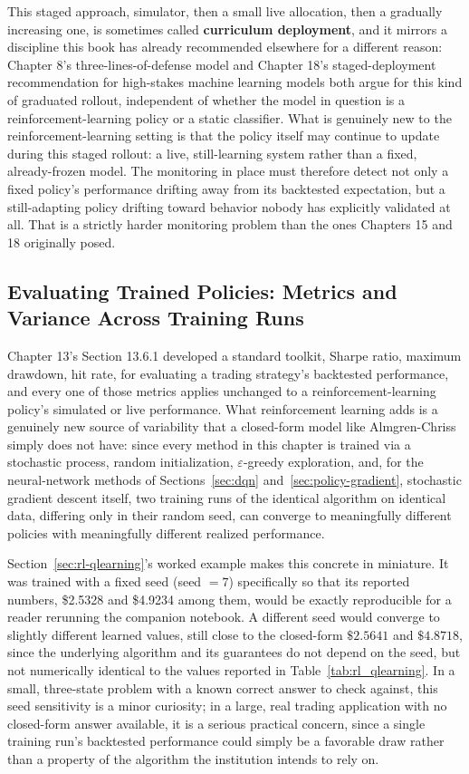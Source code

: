 \documentclass[../ai_in_finance]{subfiles}
\begin{document}
This staged approach, simulator, then a small live allocation, then a gradually increasing one, is sometimes called \textbf{curriculum deployment}, and it mirrors a discipline this book has already recommended elsewhere for a different reason: Chapter 8's three-lines-of-defense model and Chapter 18's staged-deployment recommendation for high-stakes machine learning models both argue for this kind of graduated rollout, independent of whether the model in question is a reinforcement-learning policy or a static classifier. What is genuinely new to the reinforcement-learning setting is that the policy itself may continue to update during this staged rollout: a live, still-learning system rather than a fixed, already-frozen model. The monitoring in place must therefore detect not only a fixed policy's performance drifting away from its backtested expectation, but a still-adapting policy drifting toward behavior nobody has explicitly validated at all. That is a strictly harder monitoring problem than the ones Chapters 15 and 18 originally posed.

\subsection{Evaluating Trained Policies: Metrics and Variance Across Training Runs}
\label{sec:rl-eval-metrics}

Chapter 13's Section 13.6.1 developed a standard toolkit, Sharpe ratio, maximum drawdown, hit rate, for evaluating a trading strategy's backtested performance, and every one of those metrics applies unchanged to a reinforcement-learning policy's simulated or live performance. What reinforcement learning adds is a genuinely new source of variability that a closed-form model like Almgren-Chriss simply does not have: since every method in this chapter is trained via a stochastic process, random initialization, $\varepsilon$-greedy exploration, and, for the neural-network methods of Sections~\ref{sec:dqn} and~\ref{sec:policy-gradient}, stochastic gradient descent itself, two training runs of the identical algorithm on identical data, differing only in their random seed, can converge to meaningfully different policies with meaningfully different realized performance.

Section~\ref{sec:rl-qlearning}'s worked example makes this concrete in miniature. It was trained with a fixed seed (seed $=7$) specifically so that its reported numbers, \$2.5328 and \$4.9234 among them, would be exactly reproducible for a reader rerunning the companion notebook. A different seed would converge to slightly different learned values, still close to the closed-form $\$2.5641$ and $\$4.8718$, since the underlying algorithm and its guarantees do not depend on the seed, but not numerically identical to the values reported in Table~\ref{tab:rl_qlearning}. In a small, three-state problem with a known correct answer to check against, this seed sensitivity is a minor curiosity; in a large, real trading application with no closed-form answer available, it is a serious practical concern, since a single training run's backtested performance could simply be a favorable draw rather than a property of the algorithm the institution intends to rely on.
\end{document}
